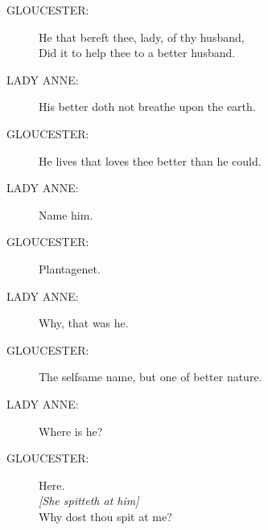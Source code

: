 \documentclass{article}
\begin{document}
\begin{description}
\item[GLOUCESTER:] 
\hspace{1pt}He that bereft thee, lady, of thy husband,\\
\hspace{1pt}Did it to help thee to a better husband.\\
\end{description}
\begin{description}
\item[LADY ANNE:] 
\hspace{1pt}His better doth not breathe upon the earth.\\
\end{description}
\begin{description}
\item[GLOUCESTER:] 
\hspace{1pt}He lives that loves thee better than he could.\\
\end{description}
\begin{description}
\item[LADY ANNE:] 
\hspace{1pt}Name him.\\
\end{description}
\begin{description}
\item[GLOUCESTER:] 
\hspace{1pt}Plantagenet.\\
\end{description}
\begin{description}
\item[LADY ANNE:] 
\hspace{1pt}Why, that was he.\\
\end{description}
\begin{description}
\item[GLOUCESTER:] 
\hspace{1pt}The selfsame name, but one of better nature.\\
\end{description}
\begin{description}
\item[LADY ANNE:] 
\hspace{1pt}Where is he?\\
\end{description}
\begin{description}
\item[GLOUCESTER:] 
\hspace{1pt}Here.\\
{\it [She spitteth at him]}\\
\hspace{1pt}Why dost thou spit at me?\\
\end{description}
\end{document}
